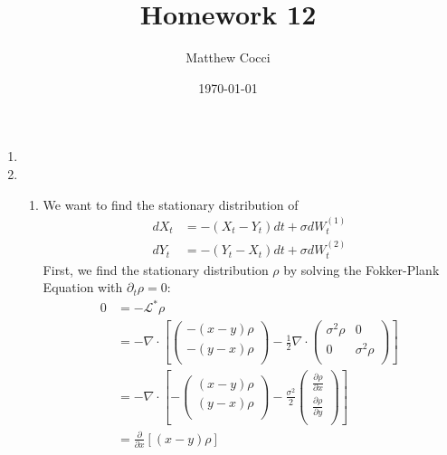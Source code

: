 \documentclass[12pt]{article}
\author{Matthew Cocci}
\title{Homework 12}
\date{\today}
\theoremstyle{plain}
\theoremstyle{definition}
\theoremstyle{remark}
\begin{document}
\maketitle



\begin{enumerate}
  \item %
  \item %
    \begin{enumerate}
      \item %
        We want to find the stationary distribution of
        \begin{align*}
          dX_t &= -(X_t - Y_t)dt + \sigma dW_t^{(1)} \\
          dY_t &= -(Y_t - X_t)dt + \sigma dW_t^{(2)}
        \end{align*}
        First, we find the stationary distribution $\rho$ by solving the
        Fokker-Plank Equation with $\partial_t \rho=0$:
        \begin{align*}
          0 &= -\mathscr{L}^*\rho\\
          &= -\nabla \cdot
          \left[
          \begin{pmatrix}
            -(x-y)\rho\\
            -(y-x)\rho\\
          \end{pmatrix}
          - \frac{1}{2} \nabla \cdot
          \begin{pmatrix}
            \sigma^2 \rho & 0 \\
            0 & \sigma^2 \rho\\
          \end{pmatrix}
          \right]\\
          &= -\nabla \cdot
          \left[
          -\begin{pmatrix}
            (x-y)\rho\\
            (y-x)\rho\\
          \end{pmatrix}
          - \frac{\sigma^2 }{2}
          \begin{pmatrix}
            \frac{\partial \rho}{\partial x} \\
            \frac{\partial \rho}{\partial y} \\
          \end{pmatrix}
          \right]\\
          &=
          \frac{\partial}{\partial x}[(x-y)\rho]

\end{align*}
\end{enumerate}
\end{enumerate}
\end{document}
